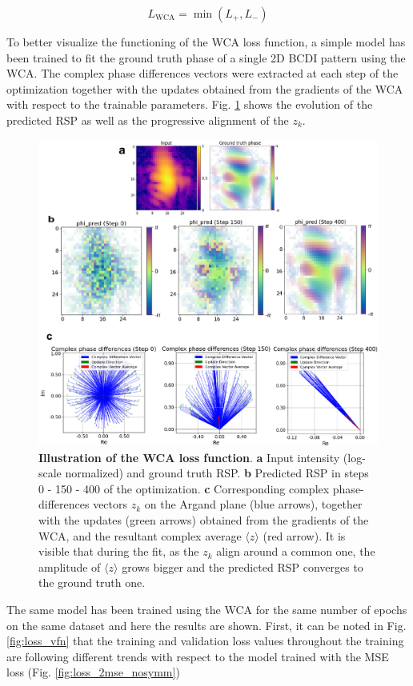 \begin{equation}
    L_{\text{WCA}} = \min\left(L_+, L_-\right)
\label{eq:WCA_2}
\end{equation}

To better visualize the functioning of the WCA loss function, a simple model has been trained to fit the ground truth phase 
of a single 2D BCDI pattern using the WCA. The complex phase differences vectors were extracted at each step of the optimization 
together with the updates obtained from the gradients of the WCA with respect to the trainable parameters. Fig. \ref{fig:WCA} 
shows the evolution of the predicted RSP as well as the progressive alignment of the  $z_k$.
\begin{figure}[H]
    \centering
    \includegraphics[width=.8\textwidth]{figures/Phasing/WCA.pdf}
    \caption{\textbf{Illustration of the WCA loss function}. \textbf{a} Input intensity (log-scale normalized) and
    ground truth RSP. \textbf{b} Predicted RSP in steps 0 - 150 - 400 of the optimization. \textbf{c} Corresponding 
    complex phase-differences vectors $z_k$ on the Argand plane (blue arrows), together with the updates (green arrows) obtained 
    from the gradients of the WCA, and the resultant complex average $\langle z \rangle$ (red arrow). It is visible that 
    during the fit, as the $z_k$ align around a common one, the amplitude of $\langle z \rangle$ grows bigger and the predicted 
    RSP converges to the ground truth one.}
    \label{fig:WCA}
\end{figure}

The same model has been trained using the WCA for the same number of epochs on the same dataset and here the results are 
shown. First, it can be noted in Fig.\ref{fig:loss_vfn} that the training and validation loss values throughout the 
training are following different trends with respect to the model trained with the MSE loss (Fig. \ref{fig:loss_2mse_nosymm})

